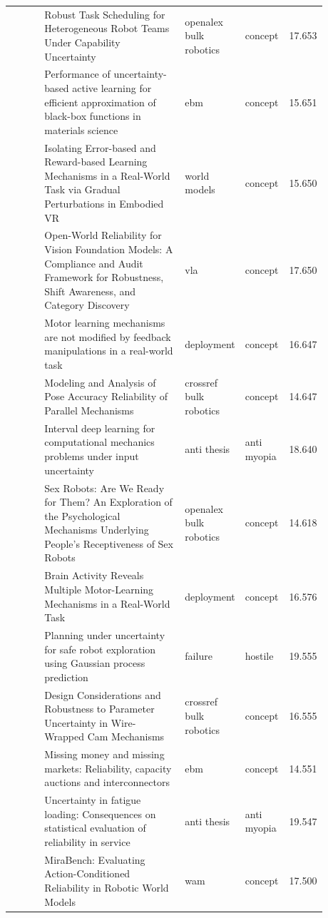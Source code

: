 \documentclass{article}
\begin{document}
\begin{center}
\begin{longtable}{p{0.12\linewidth}p{0.48\linewidth}p{0.14\linewidth}p{0.14\linewidth}r}
\citep{pool88_66} & Robust Task Scheduling for Heterogeneous Robot Teams Under Capability Uncertainty & openalex bulk robotics & concept & 17.653\\
\citep{pool88_67} & Performance of uncertainty-based active learning for efficient approximation of black-box functions in materials science & ebm & concept & 15.651\\
\citep{pool88_68} & Isolating Error-based and Reward-based Learning Mechanisms in a Real-World Task via Gradual Perturbations in Embodied VR & world models & concept & 15.650\\
\citep{pool88_69} & Open-World Reliability for Vision Foundation Models: A Compliance and Audit Framework for Robustness, Shift Awareness, and Category Discovery & vla & concept & 17.650\\
\citep{pool88_70} & Motor learning mechanisms are not modified by feedback manipulations in a real-world task & deployment & concept & 16.647\\
\citep{pool88_71} & Modeling and Analysis of Pose Accuracy Reliability of Parallel Mechanisms & crossref bulk robotics & concept & 14.647\\
\citep{pool88_72} & Interval deep learning for computational mechanics problems under input uncertainty & anti thesis & anti myopia & 18.640\\
\citep{pool88_73} & Sex Robots: Are We Ready for Them? An Exploration of the Psychological Mechanisms Underlying People's Receptiveness of Sex Robots & openalex bulk robotics & concept & 14.618\\
\citep{pool88_74} & Brain Activity Reveals Multiple Motor-Learning Mechanisms in a Real-World Task & deployment & concept & 16.576\\
\citep{pool88_75} & Planning under uncertainty for safe robot exploration using Gaussian process prediction & failure & hostile & 19.555\\
\citep{pool88_76} & Design Considerations and Robustness to Parameter Uncertainty in Wire-Wrapped Cam Mechanisms & crossref bulk robotics & concept & 16.555\\
\citep{pool88_77} & Missing money and missing markets: Reliability, capacity auctions and interconnectors & ebm & concept & 14.551\\
\citep{pool88_78} & Uncertainty in fatigue loading: Consequences on statistical evaluation of reliability in service & anti thesis & anti myopia & 19.547\\
\citep{pool88_79} & MiraBench: Evaluating Action-Conditioned Reliability in Robotic World Models & wam & concept & 17.500\\

\end{longtable}
\end{center}
\end{document}

